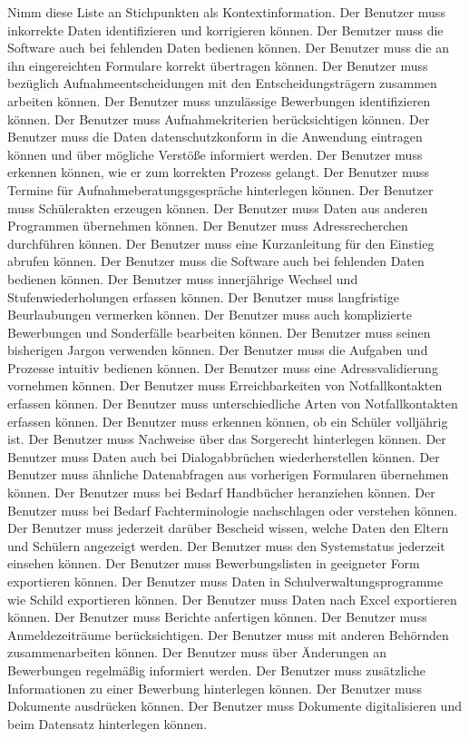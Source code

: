 Nimm diese Liste an Stichpunkten als Kontextinformation.
Der Benutzer muss inkorrekte Daten identifizieren und korrigieren können.
Der Benutzer muss die Software auch bei fehlenden Daten bedienen können. 
Der Benutzer muss die an ihn eingereichten Formulare korrekt übertragen können.
Der Benutzer muss bezüglich Aufnahmeentscheidungen mit den Entscheidungsträgern zusammen arbeiten können.
Der Benutzer muss unzulässige Bewerbungen identifizieren können.
Der Benutzer muss Aufnahmekriterien berücksichtigen können.
Der Benutzer muss die Daten datenschutzkonform in die Anwendung eintragen können und über mögliche Verstöße informiert werden.
Der Benutzer muss erkennen können, wie er zum korrekten Prozess gelangt.
Der Benutzer muss Termine für Aufnahmeberatungsgespräche hinterlegen können.
Der Benutzer muss Schülerakten erzeugen können.
Der Benutzer muss Daten aus anderen Programmen übernehmen können.
Der Benutzer muss Adressrecherchen durchführen können.
Der Benutzer muss eine Kurzanleitung für den Einstieg abrufen können.
Der Benutzer muss die Software auch bei fehlenden Daten bedienen können.
Der Benutzer muss innerjährige Wechsel und Stufenwiederholungen erfassen können.
Der Benutzer muss langfristige Beurlaubungen vermerken können.
Der Benutzer muss auch komplizierte Bewerbungen und Sonderfälle bearbeiten können.
Der Benutzer muss seinen bisherigen Jargon verwenden können.
Der Benutzer muss die Aufgaben und Prozesse intuitiv bedienen können.
Der Benutzer muss eine Adressvalidierung vornehmen können.
Der Benutzer muss Erreichbarkeiten von Notfallkontakten erfassen können.
Der Benutzer muss unterschiedliche Arten von Notfallkontakten erfassen können.
Der Benutzer muss erkennen können, ob ein Schüler volljährig ist.
Der Benutzer muss Nachweise über das Sorgerecht hinterlegen können.
Der Benutzer muss Daten auch bei Dialogabbrüchen wiederherstellen können.
Der Benutzer muss ähnliche Datenabfragen aus vorherigen Formularen übernehmen können.
Der Benutzer muss bei Bedarf Handbücher heranziehen können.
Der Benutzer muss bei Bedarf Fachterminologie nachschlagen oder verstehen können.
Der Benutzer muss jederzeit darüber Bescheid wissen, welche Daten den Eltern und Schülern angezeigt werden.
Der Benutzer muss den Systemstatus jederzeit einsehen können.
Der Benutzer muss Bewerbungslisten in geeigneter Form exportieren können.
Der Benutzer muss Daten in Schulverwaltungsprogramme wie Schild exportieren können.
Der Benutzer muss Daten nach Excel exportieren können.
Der Benutzer muss Berichte anfertigen können.
Der Benutzer muss Anmeldezeiträume berücksichtigen.
Der Benutzer muss mit anderen Behörnden zusammenarbeiten können.
Der Benutzer muss über Änderungen an Bewerbungen regelmäßig informiert werden.
Der Benutzer muss zusätzliche Informationen zu einer Bewerbung hinterlegen können.
Der Benutzer muss Dokumente ausdrücken können.
Der Benutzer muss Dokumente digitalisieren und beim Datensatz hinterlegen können.


